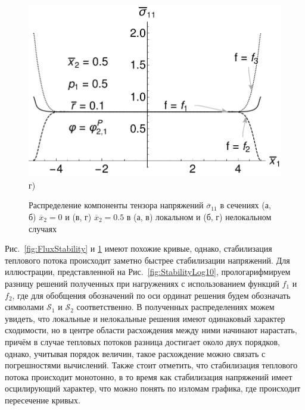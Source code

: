 \begin{figure}[ht]
\begin{minipage}[b][][b]{0.49\linewidth}
        \includegraphics[width=\linewidth]{pics/SaintVenantX05P05.pdf} \\ г)
    \end{minipage}
    \caption{Распределение компоненты тензора напряжений $\overline{\sigma}_{11}$ в сечениях (а, б) $\overline{x}_2 = 0$ и (в, г) $\overline{x}_2 = 0.5$ в (а, в) локальном и (б, г) нелокальном случаях}
    \label{fig:SaintVenant}
\end{figure}

Рис.~\ref{fig:FluxStability} и \ref{fig:SaintVenant} имеют похожие кривые, однако, стабилизация теплового потока происходит заметно быстрее стабилизации напряжений. Для иллюстрации, представленной на Рис.~\ref{fig:StabilityLog10}, прологарифмируем разницу решений полученных при нагружениях с использованием функций $f_1$ и $f_2$, где для обобщения обозначений по оси ординат решения будем обозначать символами  $\mathcal{S}_1$ и $\mathcal{S}_2$ соответственно. В полученных распределениях можем увидеть, что локальные и нелокальные решения имеют одинаковый характер сходимости, но в центре области расхождения между ними начинают нарастать, причём в случае тепловых потоков разница достигает около двух порядков, однако, учитывая порядок величин, такое расхождение можно связать с погрешностями вычислений. Также стоит отметить, что стабилизация теплового потока происходит монотонно, в то время как стабилизация напряжений имеет осцилирующий характер, что можно понять по изломам графика, где происходит пересечение кривых.

